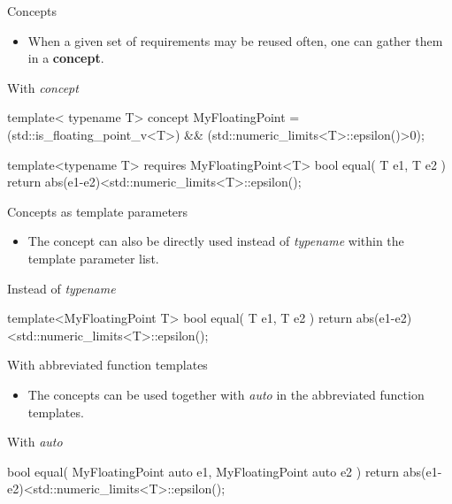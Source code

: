 \begin{frame}[fragile]
    \begin{block}{Concepts}
      \begin{itemize}
        \item When a given set of requirements may be reused often, one can gather them in a \textbf{concept}.
      \end{itemize}
    \end{block}
    \begin{exampleblock}{With {\it concept}}
      \scriptsize
      \begin{cppcode*}{}
      template< typename T>
      concept MyFloatingPoint =
        (std::is_floating_point_v<T>) &&
        (std::numeric_limits<T>::epsilon()>0);

      template<typename T>
      requires MyFloatingPoint<T>
      bool equal( T e1, T e2 )
      { return abs(e1-e2)<std::numeric_limits<T>::epsilon(); }
      \end{cppcode*}
    \end{exampleblock}
\end{frame}

\begin{frame}[fragile]
    \begin{block}{Concepts as template parameters}
      \begin{itemize}
        \item The concept can also be directly used instead of {\it typename} within the template parameter list.
      \end{itemize}
    \end{block}
    \begin{exampleblock}{Instead of {\it typename}}
      \scriptsize
      \begin{cppcode*}{}
      template<MyFloatingPoint T>
      bool equal( T e1, T e2 )
      { return abs(e1-e2)<std::numeric_limits<T>::epsilon(); }
      \end{cppcode*}
    \end{exampleblock}
\end{frame}

\begin{frame}[fragile]
    \begin{block}{With abbreviated function templates}
      \begin{itemize}
        \item The concepts can be used together with {\it auto} in the abbreviated function templates.
      \end{itemize}
    \end{block}
    \begin{exampleblock}{With {\it auto}}
      \scriptsize
      \begin{cppcode*}{}
      bool equal( MyFloatingPoint auto e1, MyFloatingPoint auto e2 )
      { return abs(e1-e2)<std::numeric_limits<T>::epsilon(); }
      \end{cppcode*}
    \end{exampleblock}
\end{frame}

